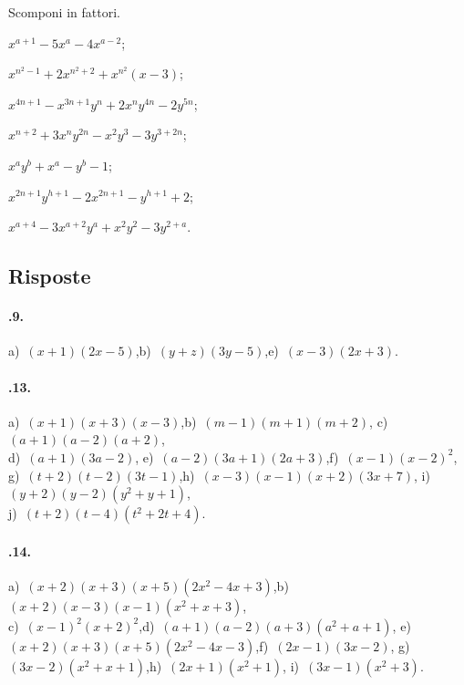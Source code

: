 \begin{esercizio}[\Ast]
 \label{ese:17.45}
 Scomponi in fattori.
 \begin{multicols}{2}
 \begin{enumeratea}
  \item $x^{a+1}-5x^{a}-4x^{a-2}$;
\item $x^{n^{2}-1}+2x^{n^{2}+2}+x^{n^{2}}(x-3)$;
\item $x^{4n+1}-x^{3n+1}y^{n}+2x^{n}y^{4n}-2y^{5n}$;
\item $x^{n+2}+3x^{n}y^{2n}-x^{2}y^{3}-3y^{3+2n}$;
\item $x^{a}y^{b}+x^{a}-y^{b}-1$;
\item $x^{2n+1}y^{h+1}-2x^{2n+1}-y^{h+1}+2$;
\item $x^{a+4}-3x^{a+2}y^{a}+x^{2}y^{2}-3y^{2+a}$.
 \end{enumeratea}
 \end{multicols}
\end{esercizio}

\subsection{Risposte}
\paragraph{\thechapter.9.} a)~$(x+1)(2x-5)$,\quad b)~$(y+z)(3y-5)$,\quad e)~$(x-3)\left(2x+3\right)$.

\paragraph{\thechapter.13.} a)~$(x+1)(x+3)\left(x-3\right)$,\quad b)~$(m-1)(m+1)\left(m+2\right)$,\quad
c)~$(a+1)(a-2)\left(a+2\right)$,\quad \protect\\
d)~$(a+1)\left(3a-2\right)$,\quad
e)~$(a-2)(3a+1)\left(2a+3\right)$,\quad f)~$(x-1)(x-2)^{2}$,\quad
g)~$(t+2)(t-2)\left(3t-1\right)$,\quad h)~$(x-3)(x-1)(x+2)(3x+7)$,\quad
i)~$(y+2)(y-2)\left(y^{2}+y+1\right)$,\quad
\protect\\j)~$(t+2)(t-4)\left(t^{2}+2t+4\right)$.

\paragraph{\thechapter.14.} a)~$(x+2)(x+3)(x+5)\left(2x^{2}-4x+3\right)$,\quad b)~$(x+2)(x-3)(x-1)\left(x^{2}+x+3\right)$,\quad
\protect\\ c)~$(x-1)^{2}\left(x+2\right)^{2}$,\quad d)~$(a+1)(a-2)(a+3)(a^{2}+a+1)$,\quad
e)~$(x+2)(x+3)(x+5)(2x^{2}-4x-3)$,\quad f)~$(2x-1)(3x-2)$,\quad
g)~$(3x-2)\left(x^{2}+x+1\right)$,\quad h)~$(2x+1)\left(x^{2}+1\right)$,\quad
i)~$(3x-1)\left(x^{2}+3\right)$.

